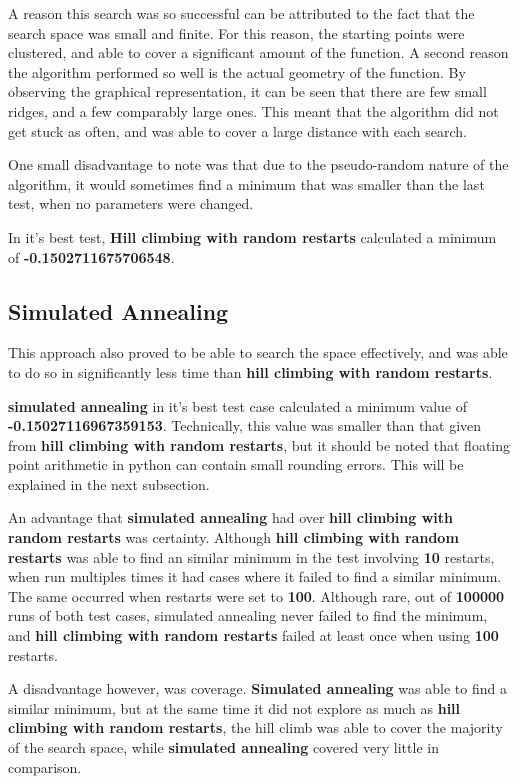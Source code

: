 \documentclass[]{report}
\begin{document}
	A reason this search was so successful can be attributed to the fact that the search space was small and finite. For this reason, the starting points were clustered, and able to cover a significant amount of the function. A second reason the algorithm performed so well is the actual geometry of the function. By observing the graphical representation, it can be seen that there are few small ridges, and a few comparably large ones. This meant that the algorithm did not get stuck as often, and was able to cover a large distance with each search. 
	
	One small disadvantage to note was that due to the pseudo-random nature of the algorithm, it would sometimes find a minimum that was smaller than the last test, when no parameters were changed.
	
	In it's best test, \textbf{Hill climbing with random restarts} calculated a minimum of \textbf{-0.1502711675706548}.
	
	\subsection{Simulated Annealing}
	This approach also proved to be able to search the space effectively, and was able to do so in significantly less time than \textbf{hill climbing with random restarts}.
	
	\textbf{simulated annealing} in it's best test case calculated a minimum value of \textbf{-0.15027116967359153}. Technically, this value was smaller than that given from \textbf{hill climbing with random restarts}, but it should be noted that floating point arithmetic in python can contain small rounding errors. This will be explained in the next subsection.
	
	An advantage that \textbf{simulated annealing} had over \textbf{hill climbing with random restarts} was certainty. Although \textbf{hill climbing with random restarts} was able to find an similar minimum in the test involving \textbf{10} restarts, when run multiples times it had cases where it failed to find a similar minimum. The same occurred when restarts were set to \textbf{100}. Although rare, out of \textbf{100000} runs of both test cases, simulated annealing never failed to find the minimum, and \textbf{hill climbing with random restarts} failed at least once when using \textbf{100} restarts.
	
	A disadvantage however, was coverage. \textbf{Simulated annealing} was able to find a similar minimum, but at the same time it did not explore as much as \textbf{hill climbing with random restarts}, the hill climb was able to cover the majority of the search space, while \textbf{simulated annealing} covered very little in comparison.
	
\end{document}
